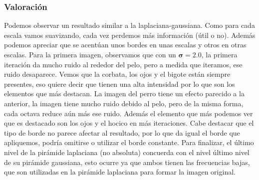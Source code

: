 \documentclass{article}
\begin{document}
\subsubsection{Valoración}
Podemos observar un resultado similar a la laplaciana-gaussiana. Como para cada escala vamos suavizando, cada vez perdemos más información (útil o no). Además podemos apreciar que se acentúan unos bordes en unas escalas y otros en otras escalas.
\newline
\newline
Para la primera imagen, observamos que con un $\boldsymbol{\sigma} = 2.0$, la primera iteración da mucho ruido al rededor del pelo, pero a medida que iteramos, ese ruido desaparece.  Vemos que la corbata, los ojos y el bigote están siempre presentes, eso quiere decir que tienen una alta intensidad por lo que son los elementos que más destacan.
\newline
\newline
La imagen del perro tiene un efecto parecido a la anterior, la imagen tiene mucho ruido debido al pelo, pero de la misma forma, cada octava reduce aún más ese ruido. Además el elemento que más podemos ver que es destacado son los ojos y el hocico en más iteraciones.
\newline
\newline
Cabe destacar que el tipo de borde no parece afectar al resultado, por lo que da igual el borde que apliquemos, podría omitirse o utilizar el borde constante.
\newline
\newline
Para finalizar, el último nivel de la pirámide laplaciana (no absoluta) concuerda con el nivel último nivel de su pirámide gaussiana, esto ocurre ya que ambos tienen las frecuencias bajas, que son utilizadas en la pirámide laplaciana para formar la imagen original.
\end{document}
